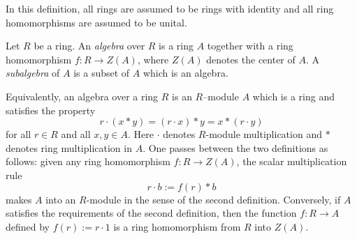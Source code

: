 \documentclass[12pt]{article}
\begin{document}
In this definition, all rings are assumed to be rings with identity and all ring homomorphisms are assumed to be unital.

Let $R$ be a ring. An \emph{algebra} over $R$ is a ring $A$ together with a ring homomorphism $f\colon R \to Z(A)$, where $Z(A)$ denotes the center of $A$. A \emph{subalgebra} of $A$ is a subset of $A$ which is an algebra.

Equivalently, an algebra over a ring $R$ is an $R$--module $A$ which is a ring and satisfies the property
$$r\cdot(x*y) = (r\cdot x)*y = x*(r\cdot y)$$
for all $r \in R$ and all $x,y \in A$. Here $\cdot$ denotes $R$-module multiplication and $*$ denotes ring multiplication in $A$. One passes between the two definitions as follows: given any ring homomorphism $f\colon R \longrightarrow Z(A)$, the scalar multiplication rule
$$
r \cdot b := f(r)*b
$$
makes $A$ into an $R$-module in the sense of the second definition. Conversely, if $A$ satisfies the requirements of the second definition, then the function $f\colon R \to A$ defined by $f(r) := r \cdot 1$ is a ring homomorphism from $R$ into $Z(A)$.
\end{document}
